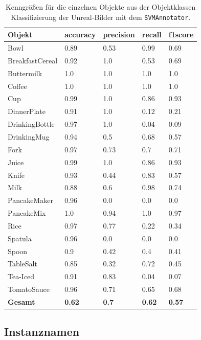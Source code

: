 \begin{table}
\begin{tabularx}{\textwidth}{Xllll}
\textbf{Objekt}	& \textbf{\gls{accuracy}} & \textbf{\gls{precision}}	& \textbf{\gls{recall}}	& \textbf{\gls{f1score}} \\ \hline
Bowl & 0.89 & 0.53 & 0.99 & 0.69 \\  
BreakfastCereal & 0.92 & 1.0 & 0.53 & 0.69 \\  
Buttermilk & 1.0 & 1.0 & 1.0 & 1.0 \\  
Coffee & 1.0 & 1.0 & 1.0 & 1.0 \\  
Cup & 0.99 & 1.0 & 0.86 & 0.93 \\  
DinnerPlate & 0.91 & 1.0 & 0.12 & 0.21 \\  
DrinkingBottle & 0.97 & 1.0 & 0.04 & 0.09 \\  
DrinkingMug & 0.94 & 0.5 & 0.68 & 0.57 \\  
Fork & 0.97 & 0.73 & 0.7 & 0.71 \\  
Juice & 0.99 & 1.0 & 0.86 & 0.93 \\  
Knife & 0.93 & 0.44 & 0.83 & 0.57 \\  
Milk & 0.88 & 0.6 & 0.98 & 0.74 \\  
PancakeMaker & 0.96 & 0.0 & 0.0 & 0.0 \\  
PancakeMix & 1.0 & 0.94 & 1.0 & 0.97 \\  
Rice & 0.97 & 0.77 & 0.22 & 0.34 \\  
Spatula & 0.96 & 0.0 & 0.0 & 0.0 \\  
Spoon & 0.9 & 0.42 & 0.4 & 0.41 \\  
TableSalt & 0.85 & 0.32 & 0.72 & 0.45 \\  
Tea-Iced & 0.91 & 0.83 & 0.04 & 0.07 \\  
TomatoSauce & 0.96 & 0.71 & 0.65 & 0.68 \\    \hline
\textbf{Gesamt}		&	\textbf{0.62}   &	\textbf{0.7}  & \textbf{0.62}     &  \textbf{0.57}     \\
\end{tabularx}
\caption[Objektklassen-spezifische Kenngrößen des SVMAnnotators]{Kenngrößen für die einzelnen Objekte aus der Objektklassen Klassifizierung der Unreal-Bilder mit dem \texttt{SVMAnnotator}.}
\label{tab:SVMClassifierGTClass_metrics}
\end{table}

\subsection{Instanznamen}

